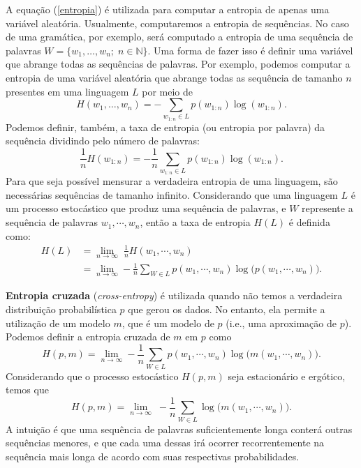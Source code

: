 \documentclass{automatextcc}
\newcommand{\N}{\mathds{N}}
\begin{document}
A equação (\ref{entropia}) é utilizada para computar a entropia de apenas uma variável aleatória. Usualmente, computaremos a entropia de sequências. No caso de uma gramática, por exemplo, será computado a entropia de uma sequência de palavras $W = \{w_1,\dots,w_n; \; n \in \N \}$. Uma forma de fazer isso é definir uma variável que abrange todas as sequências de palavras. Por exemplo, podemos computar a entropia de uma variável aleatória que abrange todas as sequência de tamanho $n$ presentes em uma linguagem $L$ por meio de
\begin{equation*}
    H(w_1,\dots,w_n) = - \sum_{w_{1:n} \in L} p(w_{1:n}) \log(w_{1:n}).
\end{equation*}
Podemos definir, também, a taxa de entropia (ou entropia por palavra) da sequência dividindo pelo número de palavras:
\begin{equation*}
    \frac{1}{n}H(w_{1:n}) = - \frac{1}{n} \sum_{w_{1:n} \in L}  p(w_{1:n}) \log(w_{1:n}).
\end{equation*}
Para que seja possível mensurar a verdadeira entropia de uma linguagem, são necessárias sequências de tamanho infinito. Considerando que uma linguagem $L$ é um processo estocástico que produz uma sequência de palavras, e $W$ represente a sequência de palavras $w_1,\cdots,w_n$, então a taxa de entropia $H(L)$ é definida como:
\begin{align*}
    H(L) & = \lim_{n \rightarrow \infty} \; \frac{1}{n} H(w_1,\cdots,w_n) \\
         & = \lim_{n \rightarrow \infty} - \frac{1}{n} \sum_{W \in L}  p(w_1,\cdots,w_n)  \log\big(p(w_1,\cdots,w_n)\big).
\end{align*}

\textbf{Entropia cruzada} (\textit{cross-entropy}) é utilizada quando não temos a verdadeira distribuição probabilística $p$ que gerou os dados. No entanto, ela permite a utilização de um modelo $m$, que é um modelo de $p$ (i.e., uma aproximação de $p$). Podemos definir a entropia cruzada de $m$ em $p$ como
\begin{equation*}
    H(p,m) = \lim_{n \rightarrow \infty}  - \frac{1}{n} \sum_{W \in L}  p(w_1,\cdots,w_n) \log\big(m(w_1,\cdots,w_n)\big) .
\end{equation*}
Considerando que o processo estocástico $H(p,m)$ seja estacionário e ergótico, temos que
\begin{equation}
    H(p,m) = \lim_{n \rightarrow \infty} \; - \frac{1}{n} \sum_{W \in L} \log\big(m(w_1,\cdots,w_n)\big).
\end{equation}
A intuição é que uma sequência de palavras suficientemente longa conterá outras sequências menores, e que cada uma dessas irá ocorrer recorrentemente na sequência mais longa de acordo com suas respectivas probabilidades.
\end{document}
